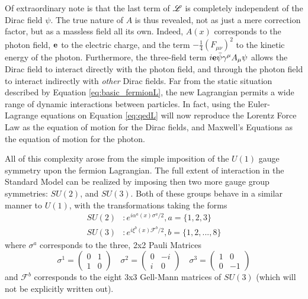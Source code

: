     Of extraordinary note is that the last term of $\mathscr{L}$ is completely independent of the Dirac field $\psi$.
    The true nature of $A$ is thus revealed, not as just a mere correction factor,
        but as a massless field all its own.
    Indeed, $A(x)$ corresponds to the photon field, $\mathbf{e}$ to the electric charge,
        and the term $-\frac{1}{4}(F_{\mu\nu})^2$ to the kinetic energy of the photon.
    Furthermore, the three-field term $i \mathbf{e} \bar{\psi} \gamma^\mu A_\mu \psi$
        allows the Dirac field to interact directly with the photon field,
        and through the photon field to interact indirectly with \textit{other} Dirac fields.
    Far from the static situation described by Equation \ref{eq:basic_fermionL},
        the new Lagrangian permits a wide range of dynamic interactions between particles.
    In fact, using the Euler-Lagrange equations on Equation \ref{eq:qedL}
        will now reproduce the Lorentz Force Law as the equation of motion for the Dirac fields,
        and Maxwell's Equations as the equation of motion for the photon.

    All of this complexity arose from the simple imposition of the $U(1)$ gauge symmetry upon the fermion Lagrangian.
    The full extent of interaction in the Standard Model can be realized by imposing then two more gauge group symmetries:
        $SU(2)$, and $SU(3)$.
    Both of these groups behave in a similar manner to $U(1)$, with the transformations taking the forms
    \begin{equation} \begin{split}
        SU(2)&: e^{i \alpha^a(x) \sigma^a / 2}, a=\{1,2,3\}
        \\SU(3)&: e^{i \xi^b(x) \mathscr{F}^b / 2}, b=\{1,2, ..., 8\}
    \end{split} \end{equation}
    where $\sigma^a$ corresponds to the three, 2x2 Pauli Matrices
    \begin{equation}
        \sigma^1 = \begin{pmatrix} 0 & 1 \\ 1 & 0 \end{pmatrix} \quad
        \sigma^2 = \begin{pmatrix} 0 & -i \\ i & 0 \end{pmatrix} \quad
        \sigma^3 = \begin{pmatrix} 1 & 0 \\ 0 & -1 \end{pmatrix}
    \end{equation}
    and $\mathscr{F}^b$ corresponds to the eight 3x3 Gell-Mann matrices of $SU(3)$
        (which will not be explicitly written out).

